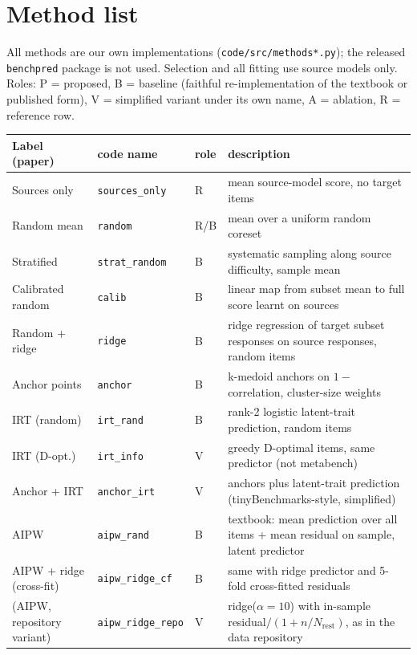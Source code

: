 \FloatBarrier
\section{Method list}\label{app:methods}
All methods are our own implementations (\texttt{code/src/methods*.py}); the released \texttt{benchpred} package is not used. Selection and all fitting use source models only. Roles: P = proposed, B = baseline (faithful re-implementation of the textbook or published form), V = simplified variant under its own name, A = ablation, R = reference row.
\begin{center}\scriptsize
\begin{tabular}{@{}l>{\raggedright\arraybackslash}p{4.4cm}l p{5.3cm}@{}}
\toprule
Label (paper) & code name & role & description \\
\midrule
Sources only & \texttt{sources\_only} & R & mean source-model score, no target items \\
Random mean & \texttt{random} & R/B & mean over a uniform random coreset \\
Stratified & \texttt{strat\_random} & B & systematic sampling along source difficulty, sample mean \\
Calibrated random & \texttt{calib} & B & linear map from subset mean to full score learnt on sources \\
Random + ridge & \texttt{ridge} & B & ridge regression of target subset responses on source responses, random items \\
Anchor points & \texttt{anchor} & B & k-medoid anchors on $1-$correlation, cluster-size weights~\citep{vivek2024anchor} \\
IRT (random) & \texttt{irt\_rand} & B & rank-2 logistic latent-trait prediction, random items \\
IRT (D-opt.) & \texttt{irt\_info} & V & greedy D-optimal items, same predictor (not metabench) \\
Anchor + IRT & \texttt{anchor\_irt} & V & anchors plus latent-trait prediction (tinyBenchmarks-style, simplified) \\
AIPW & \texttt{aipw\_rand} & B & textbook: mean prediction over all items + mean residual on sample, latent predictor \\
AIPW + ridge (cross-fit) & \texttt{aipw\_ridge\_cf} & B & same with ridge predictor and 5-fold cross-fitted residuals \\
(AIPW, repository variant) & \texttt{aipw\_ridge\_repo} & V & ridge($\alpha{=}10$) with in-sample residual$/(1+n/N_{\text{rest}})$, as in the data repository \\

\end{tabular}
\end{center}
